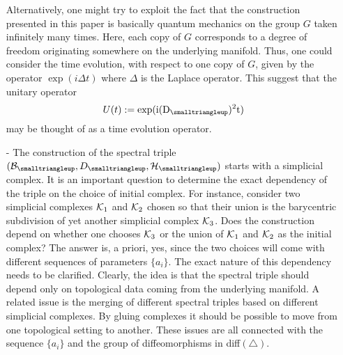 \documentclass[12pt]{article}
\def\cb{{\cal B}}
\def\ch{{\cal H}}
\def\ck{{\cal K}}
\begin{document}
\begin{itemize}
Alternatively, one might try to exploit the fact that the construction presented in this paper is basically quantum mechanics on the group $G$ taken infinitely many times. Here, each copy of $G$ corresponds to a degree of freedom originating somewhere on the underlying manifold. Thus, one could consider the time evolution, with respect to one copy of $G$, given by the operator $\exp(i\Delta t)$ where $\Delta$ is the Laplace operator. This suggest that the unitary operator
\[
U(t):=\exp(\rm{i}(D_{\smalltriangleup})^2t)
\]
may be thought of as a time evolution operator.
\item[-]
The construction of the spectral triple $(\cb_{\smalltriangleup},D_{\smalltriangleup},\ch_\smalltriangleup)$ starts with a simplicial complex. It is an important question to determine the exact dependency of the triple on the choice of initial complex. For instance, consider two simplicial complexes $\ck_1$ and $\ck_2$ chosen so that their union is the barycentric subdivision of yet another simplicial complex $\ck_3$. Does the construction depend on whether one chooses $\ck_3$ or the union of $\ck_1$ and $\ck_2$ as the initial complex? The answer is, a priori, yes, since the two choices will come with different sequences of parameters $\{a_i\}$. The exact nature of this dependency needs to be clarified. Clearly, the idea is that the spectral triple should depend only on topological data coming from the underlying manifold. A related issue is the merging of different spectral triples based on different simplicial complexes. By gluing complexes it should be possible to move from one topological setting to another. These issues are all connected with the sequence $\{a_i\}$ and the group of diffeomorphisms in diff$(\triangle)$. 

\end{itemize}
\end{document}
